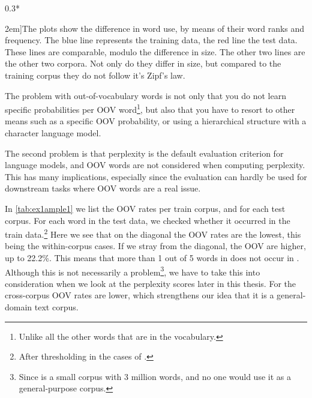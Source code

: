 \begin{figure*}
{\begin{scaletikzpicturetowidth}{0.3*\textwidth}
	\end{scaletikzpicturetowidth}}%
	
	\caption[][2em]{The plots show the difference in word use, by means of their word ranks and frequency. The blue line represents the training data, the red line the test data. These lines are comparable, modulo the difference in size. The other two lines are the other two corpora. Not only do they differ in size, but compared to the training corpus they do not follow it's Zipf's law.}
\end{figure*}

The problem with out-of-vocabulary words is not only that you do not learn specific probabilities per OOV word\footnote{Unlike all the other words that are in the vocabulary.}, but also that you have to resort to other means such as a specific OOV probability, or using a hierarchical structure with a character language model.

The second problem is that perplexity is the default evaluation criterion for language models, and OOV words are not considered when computing perplexity. This has many implications, especially since the evaluation can hardly be used for downstream tasks where OOV words are a real issue.

In \cref{tab:ex1ample1} we list the OOV rates per train corpus, and for each test corpus. For each word in the test data, we checked whether it occurred in the train data.\footnote{After thresholding in the cases of \obw.}
Here we see that on the diagonal the OOV rates are the lowest, this being the within-corpus cases. If we stray from the diagonal, the OOV are higher, up to 22.2\%. This means that more than 1 out of 5 words in \wp does not occur in \emea. Although this is not necessarily a problem\footnote{Since \emea is a small corpus with 3 million words, and no one would use it as a general-purpose corpus.}, we have to take this into consideration when we look at the perplexity scores later in this thesis.
For \obw the cross-corpus OOV rates are lower, which strengthens our idea that it is a general-domain text corpus.

